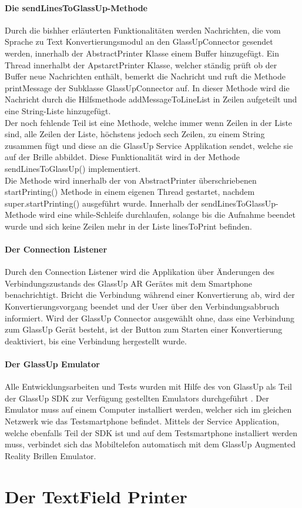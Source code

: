 \paragraph{Die sendLinesToGlassUp-Methode}
Durch die bishher erläuterten Funktionalitäten werden Nachrichten, die vom Sprache zu Text Konvertierungsmodul an den GlassUpConnector gesendet werden, innerhalb der AbstractPrinter Klasse einem Buffer hinzugefügt. Ein Thread innerhalbt der ApstarctPrinter Klasse, welcher ständig prüft ob der Buffer neue Nachrichten enthält, bemerkt die Nachricht und ruft die Methode printMessage der Subklasse GlassUpConnector auf. In dieser Methode wird die Nachricht durch die Hilfsmethode addMessageToLineList in Zeilen aufgeteilt und eine String-Liste hinzugefügt.\\
Der noch fehlende Teil ist eine Methode, welche immer wenn Zeilen in der Liste sind, alle Zeilen der Liste, höchstens jedoch sech Zeilen, zu einem String zusammen fügt und diese an die GlassUp Service Applikation sendet, welche sie auf der Brille abbildet. Diese Funktionalität wird in der Methode sendLinesToGlassUp() implementiert.\\
Die Methode wird innerhalb der von AbstractPrinter überschriebenen startPrinting() Methode in einem eigenen Thread gestartet, nachdem super.startPrinting() ausgeführt wurde. Innerhalb der sendLinesToGlassUp-Methode wird eine while-Schleife durchlaufen, solange bis die Aufnahme beendet wurde  und sich keine Zeilen mehr in der Liste linesToPrint befinden.\\

\paragraph{Der Connection Listener}
Durch den Connection Listener wird die Applikation über Änderungen des Verbindungszustands des GlassUp AR Gerätes mit dem Smartphone  benachrichtigt. Bricht die Verbindung während einer Konvertierung ab, wird der Konvertierungsvorgang beendet und der User über den Verbindungsabbruch informiert. Wird der GlassUp Connector ausgewählt ohne, dass eine Verbindung zum GlassUp Gerät besteht, ist der Button zum Starten einer Konvertierung deaktiviert, bis eine Verbindung hergestellt wurde.

\paragraph{Der GlassUp Emulator}
Alle Entwicklungsarbeiten und Tests wurden mit Hilfe des von GlassUp als Teil der GlassUp SDK zur Verfügung gestellten Emulators durchgeführt \cite{glassup_emulator_2017}.
Der Emulator muss auf einem Computer installiert werden, welcher sich im gleichen Netzwerk wie das Testsmartphone befindet. Mittels der Service Application, welche ebenfalls Teil der SDK ist und auf dem Testsmartphone installiert werden muss, verbindet sich das Mobiltelefon automatisch mit dem GlassUp Augmented Reality Brillen Emulator.

\section{Der TextField Printer}